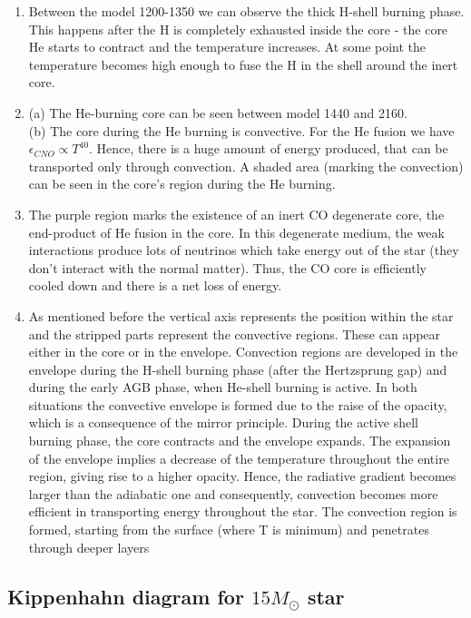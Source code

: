 \documentclass{article}
\begin{document}
\begin{enumerate}
    \item Between the model 1200-1350 we can observe the thick H-shell burning phase. This happens after the H is completely exhausted inside the core - the core He starts to contract and the temperature increases. At some point the temperature becomes high enough to fuse the H in the shell around the inert core.
    \item (a) The He-burning core can be seen between model 1440 and 2160.
    \\
    (b) The core during the He burning is convective. For the He fusion we have $\epsilon_{CNO} \propto T^{40}$. Hence, there is a huge amount of energy produced, that can be transported only through convection. A shaded area (marking the convection) can be seen in the core's region during the He burning.
    \item The purple region marks the existence of an inert CO degenerate core, the end-product of He fusion in the core. In this degenerate medium, the weak interactions produce lots of neutrinos which take energy out of the star (they don't interact with the normal matter). Thus, the CO core is efficiently cooled down and there is a net loss of energy.
    \item As mentioned before the vertical axis represents the position within the star and the stripped parts represent the convective regions. These can appear either in the core or in the envelope. Convection regions are developed in the envelope during the H-shell burning phase (after the Hertzsprung gap) and during the early AGB phase, when He-shell burning is active. In both situations the convective envelope is formed due to the raise of the opacity, which is a consequence of the mirror principle. During the active shell burning phase, the core contracts and the envelope expands. The expansion of the envelope implies a decrease of the temperature throughout the entire region, giving rise to a higher opacity. Hence, the radiative gradient becomes larger than the adiabatic one and consequently, convection becomes more efficient in transporting energy throughout the star. The convection region is formed, starting from the surface (where T is minimum) and penetrates through deeper layers
\end{enumerate}


\subsection{Kippenhahn diagram for $15M_{\odot}$ star}
\end{document}
